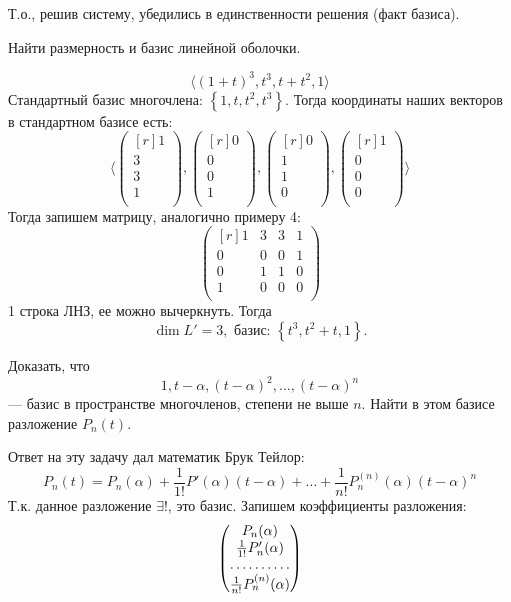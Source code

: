 Т.о., решив систему, убедились в единственности решения (факт базиса).
\begin{prim}
	Найти размерность и базис линейной оболочки.
\end{prim}
$$
\langle (1+t)^3, t^3, t+t^2, 1\rangle 
$$
Стандартный базис многочлена: $\left\{1, t, t^2, t^3 \right\}$.
Тогда координаты наших векторов в стандартном базисе есть:
$$
\langle 
\begin{pmatrix*}[r]
1\\
3\\
3\\
1\\
\end{pmatrix*}
,
\begin{pmatrix*}[r]
0\\
0\\
0\\
1\\
\end{pmatrix*}
,
\begin{pmatrix*}[r]
0\\
1\\
1\\
0\\
\end{pmatrix*}
,
\begin{pmatrix*}[r]
1\\
0\\
0\\
0\\
\end{pmatrix*}
\rangle 
$$
Тогда запишем матрицу, аналогично примеру 4:
$$
\begin{pmatrix*}[r]
1 & 3 & 3 & 1\\
0 & 0 & 0 & 1\\
0 & 1 & 1 & 0\\
1 & 0 & 0 & 0\\
\end{pmatrix*}
$$
1 строка ЛНЗ, ее можно вычеркнуть. Тогда
$$
\dim L'=3, \text{ базис: } \left\{t^3, t^2+t, 1\right\}.
$$
\begin{prim}
	Доказать, что
	$$
	1, t-\alpha, (t-\alpha)^2, \dots, (t-\alpha)^n
	$$
	--- базис в пространстве многочленов, степени не выше $n$. Найти в этом базисе разложение $P_n(t)$.
\end{prim}
Ответ на эту задачу дал математик Брук Тейлор:
$$
P_n(t)=P_n(\alpha)+\frac{1}{1!}P'(\alpha)(t-\alpha)+\dots+\frac{1}{n!}P^{(n)}_n(\alpha)(t-\alpha)^n
$$
Т.к. данное разложение $\exists !$, это базис. Запишем коэффициенты разложения:
$$
\begin{pmatrix*}[c]
P_n(\alpha)\\
\frac{1}{1!}P'_n(\alpha)\\
\hdotsfor{1}\\
\frac{1}{n!}P^{(n)}_n(\alpha)
\end{pmatrix*}
$$
